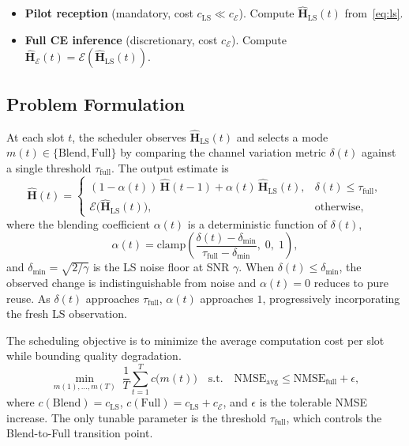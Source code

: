 \begin{itemize}
\item \textbf{Pilot reception} (mandatory, cost $c_{\mathrm{LS}} \ll c_{\mathcal{E}}$). Compute $\hat{\mathbf{H}}_{\mathrm{LS}}(t)$ from~\eqref{eq:ls}.
\item \textbf{Full CE inference} (discretionary, cost $c_{\mathcal{E}}$). Compute $\hat{\mathbf{H}}_{\mathcal{E}}(t) = \mathcal{E}(\hat{\mathbf{H}}_{\mathrm{LS}}(t))$.
\end{itemize}

\subsection{Problem Formulation}

At each slot $t$, the scheduler observes $\hat{\mathbf{H}}_{\mathrm{LS}}(t)$ and selects a mode $m(t) \in \{\text{Blend}, \text{Full}\}$ by comparing the channel variation metric $\delta(t)$ against a single threshold $\tau_{\mathrm{full}}$.
The output estimate is
%
\begin{equation}\label{eq:action}
\hat{\mathbf{H}}(t) =
\begin{cases}
  (1{-}\alpha(t))\,\hat{\mathbf{H}}(t{-}1) + \alpha(t)\,\hat{\mathbf{H}}_{\mathrm{LS}}(t), & \delta(t) \leq \tau_{\mathrm{full}},\\[3pt]
  \mathcal{E}\bigl(\hat{\mathbf{H}}_{\mathrm{LS}}(t)\bigr), & \text{otherwise},
\end{cases}
\end{equation}
%
where the blending coefficient $\alpha(t)$ is a deterministic function of $\delta(t)$,
%
\begin{equation}\label{eq:alpha}
  \alpha(t) = \mathrm{clamp}\!\left(
    \frac{\delta(t) - \delta_{\min}}{\tau_{\mathrm{full}} - \delta_{\min}},\; 0,\; 1
  \right),
\end{equation}
%
and $\delta_{\min} = \sqrt{2/\gamma}$ is the LS noise floor at SNR $\gamma$.
When $\delta(t) \leq \delta_{\min}$, the observed change is indistinguishable from noise and $\alpha(t) = 0$ reduces to pure reuse.
As $\delta(t)$ approaches $\tau_{\mathrm{full}}$, $\alpha(t)$ approaches $1$, progressively incorporating the fresh LS observation.

The scheduling objective is to minimize the average computation cost per slot while bounding quality degradation.
%
\begin{equation}\label{eq:objective}
  \min_{m(1),\ldots,m(T)} \;\frac{1}{T}\sum_{t=1}^{T} c\bigl(m(t)\bigr)
  \quad \text{s.t.} \quad
  \mathrm{NMSE}_{\mathrm{avg}} \leq \mathrm{NMSE}_{\mathrm{full}} + \epsilon,
\end{equation}
%
where $c(\text{Blend}) = c_{\mathrm{LS}}$, $c(\text{Full}) = c_{\mathrm{LS}} + c_{\mathcal{E}}$, and $\epsilon$ is the tolerable NMSE increase.
The only tunable parameter is the threshold $\tau_{\mathrm{full}}$, which controls the Blend-to-Full transition point.

